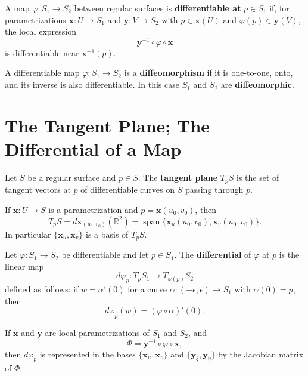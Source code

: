 \documentclass[12pt, oneside]{book}
\begin{document}
\begin{definition}
    A map $\varphi:S_1\rightarrow S_2$ between regular surfaces is
    \textbf{differentiable at} $p\in S_1$ if, for parametrizations
    $\mathbf{x}:U\rightarrow S_1$ and $\mathbf{y}:V\rightarrow S_2$ with
    $p\in \mathbf{x}(U)$ and $\varphi(p)\in \mathbf{y}(V)$, the local
    expression
    \[
        \mathbf{y}^{-1}\circ \varphi\circ \mathbf{x}
    \]
    is differentiable near $\mathbf{x}^{-1}(p)$.
\end{definition}

\begin{definition}
    A differentiable map $\varphi:S_1\rightarrow S_2$ is a
    \textbf{diffeomorphism} if it is one-to-one, onto, and its inverse is also
    differentiable.  In this case $S_1$ and $S_2$ are \textbf{diffeomorphic}.
\end{definition}

\section{The Tangent Plane; The Differential of a Map}

\begin{definition}
    Let $S$ be a regular surface and $p\in S$.  The \textbf{tangent plane}
    $T_pS$ is the set of tangent vectors at $p$ of differentiable curves on
    $S$ passing through $p$.
\end{definition}

\begin{proposition}
    If $\mathbf{x}:U\rightarrow S$ is a parametrization and
    $p=\mathbf{x}(u_0,v_0)$, then
    \[
        T_pS=d\mathbf{x}_{(u_0,v_0)}(\mathbb{R}^2)
        =
        \operatorname{span}\{\mathbf{x}_u(u_0,v_0),
        \mathbf{x}_v(u_0,v_0)\}.
    \]
    In particular $\{\mathbf{x}_u,\mathbf{x}_v\}$ is a basis of $T_pS$.
\end{proposition}

\begin{definition}
    Let $\varphi:S_1\rightarrow S_2$ be differentiable and let $p\in S_1$.
    The \textbf{differential} of $\varphi$ at $p$ is the linear map
    \[
        d\varphi_p:T_pS_1\rightarrow T_{\varphi(p)}S_2
    \]
    defined as follows: if $w=\alpha'(0)$ for a curve
    $\alpha:(-\epsilon,\epsilon)\rightarrow S_1$ with $\alpha(0)=p$, then
    \[
        d\varphi_p(w)=(\varphi\circ \alpha)'(0).
    \]
\end{definition}

\begin{remark}
    If $\mathbf{x}$ and $\mathbf{y}$ are local parametrizations of $S_1$ and
    $S_2$, and
    \[
        \Phi=\mathbf{y}^{-1}\circ \varphi\circ \mathbf{x},
    \]
    then $d\varphi_p$ is represented in the bases
    $\{\mathbf{x}_u,\mathbf{x}_v\}$ and $\{\mathbf{y}_\xi,\mathbf{y}_\eta\}$
    by the Jacobian matrix of $\Phi$.
\end{remark}
\end{document}
